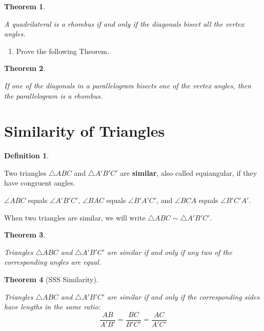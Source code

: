 \documentclass[
]{book}
\providecommand{\tightlist}{%
  \setlength{\itemsep}{0pt}\setlength{\parskip}{0pt}}
\newtheorem{theorem}{Theorem}[chapter]
\theoremstyle{definition}
\newtheorem{definition}{Definition}[chapter]
\theoremstyle{definition}
\theoremstyle{definition}
\theoremstyle{definition}
\theoremstyle{remark}
\begin{document}
\begin{theorem}
\protect\hypertarget{thm:unlabeled-div-176}{}\label{thm:unlabeled-div-176}

A quadrilateral is a rhombus if and only if the diagonals bisect all the vertex angles.

\end{theorem}

\begin{enumerate}
\def\labelenumi{\arabic{enumi}.}
\tightlist
\item
  Prove the following Theorem.
\end{enumerate}

\begin{theorem}
\protect\hypertarget{thm:unlabeled-div-177}{}\label{thm:unlabeled-div-177}

If one of the diagonals in a parallelogram bisects one of the vertex angles, then the parallelogram is a rhombus.

\end{theorem}

\hypertarget{similarity-of-triangles}{%
\section{Similarity of Triangles}\label{similarity-of-triangles}}

\begin{definition}
\protect\hypertarget{def:unlabeled-div-178}{}\label{def:unlabeled-div-178}

Two triangles \(\triangle ABC\) and \(\triangle A'B'C'\) are \textbf{similar}, also called equiangular, if they have congruent angles.

\(\angle ABC\) equals \(\angle A'B'C'\), \(\angle BAC\) equals \(\angle B'A'C'\), and \(\angle BCA\) equals \(\angle B'C'A'\).

\end{definition}

When two triangles are similar, we will write \(\triangle ABC \sim \triangle A'B'C'\).

\begin{theorem}
\protect\hypertarget{thm:AA-similarity}{}\label{thm:AA-similarity}

Triangles \(\triangle ABC\) and \(\triangle A'B'C'\) are similar if and only if any two of the corresponding angles are equal.

\end{theorem}

\begin{theorem}[SSS Similarity]
\protect\hypertarget{thm:SSS-similarity}{}\label{thm:SSS-similarity}

Triangles \(\triangle ABC\) and \(\triangle A'B'C'\) are similar if and only if the corresponding sides have lengths in the same ratio:
\[\frac{AB}{A'B'} = \frac{BC}{B'C'} = \frac{AC}{A'C'}\]

\end{theorem}
\end{document}

